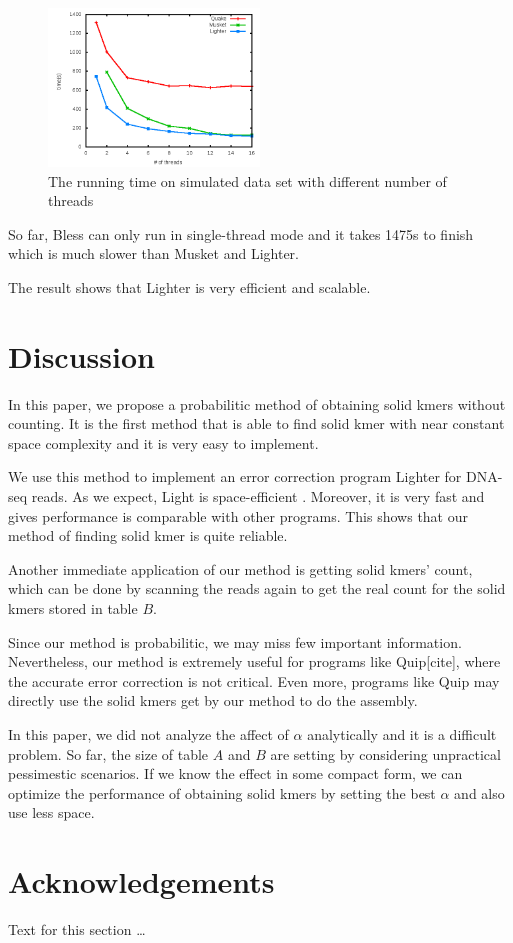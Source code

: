 \documentclass[10pt]{article}
\begin{document}
\begin{figure}[h!]
\begin{center}
\includegraphics[width=0.5\textwidth]{runtime.png}
\end{center}
\caption{The running time on simulated data set with different number of threads\label{fig:runtime}}
\end{figure}

So far, Bless can only run in single-thread mode and it takes 1475s to finish which is much slower than Musket and Lighter.

The result shows that Lighter is very efficient and scalable. 

\section*{Discussion}
In this paper, we propose a probabilitic method of obtaining solid kmers without counting. It is the first method that is able to find solid kmer with near constant space complexity and it is very easy to implement.

We use this method to implement an error correction program Lighter for DNA-seq reads. As we expect, Light is space-efficient . Moreover, it is very fast and gives performance is comparable with other programs. This shows that our method of finding solid kmer is quite reliable. 

Another immediate application of our method is getting solid kmers' count, which can be done by scanning the reads again to get the real count for the solid kmers stored in table $B$. 

Since our method is probabilitic, we may miss few important information. Nevertheless, our method is extremely useful for programs like Quip[cite], where the accurate error correction is not critical. Even more, programs like Quip may directly use the solid kmers get by our method to do the assembly.

In this paper, we did not analyze the affect of $\alpha$ analytically and it is a difficult problem. So far, the size of table $A$ and $B$ are setting by considering unpractical pessimestic scenarios. If we know the effect in some compact form, we can optimize the performance of obtaining solid kmers by setting the best $\alpha$ and also use less space.

\section*{Acknowledgements}
  Text for this section \ldots



\end{document}
